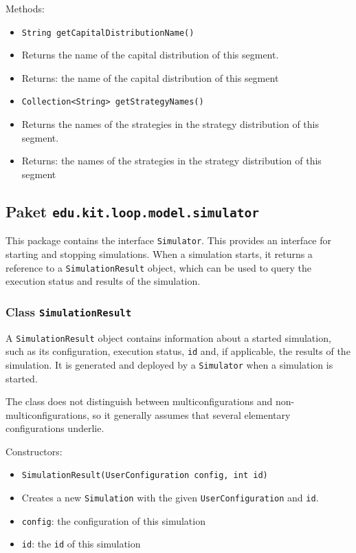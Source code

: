 \documentclass[parskip=full,11pt]{scrartcl}
\begin{document}
Methods:
\begin{itemize}\itemsep -10pt
\item \texttt{String getCapitalDistributionName()}
\item[] Returns the name of the capital distribution of this segment.
\item[] Returns: the name of the capital distribution of this segment

\item \texttt{Collection<String> getStrategyNames()}
\item[] Returns the names of the strategies in the strategy distribution of this segment.
\item[] Returns: the names of the strategies in the strategy distribution of this segment
\end{itemize}


\subsection{Paket \texttt{edu.kit.loop.model.simulator}}
This package contains the interface \texttt{Simulator}. This provides an interface for starting and stopping simulations. When a simulation starts, it returns a reference to a \texttt{SimulationResult} object, which can be used to query the execution status and results of the simulation.

\subsubsection{Class \texttt{SimulationResult}}
A \texttt{SimulationResult} object contains information about a started simulation, such as its configuration, execution status, \texttt{id} and, if applicable, the results of the simulation. It is generated and deployed by a \texttt{Simulator} when a simulation is started.

The class does not distinguish between multiconfigurations and non-multiconfigurations, so it generally assumes that several elementary configurations underlie.

Constructors:
\begin{itemize} \itemsep -10pt
	\item \texttt{SimulationResult(UserConfiguration config, int id)}
	\item[] Creates a new \texttt{Simulation} with the given \texttt{UserConfiguration} and \texttt{id}.
	\item[] \texttt{config}: the configuration of this simulation
	\item[] \texttt{id}: the \texttt{id} of this simulation
\end{itemize}
\end{document}
